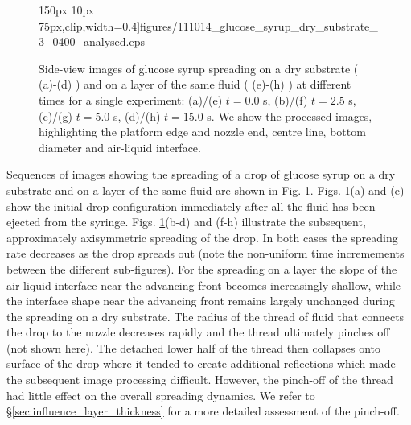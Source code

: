 \documentclass[aip,graphicx]{revtex4-1}
\begin{document}
\begin{figure}[!ht]
{{       150px 10px
       75px},clip,width=0.4\textwidth]{figures/111014_glucose_syrup_dry_substrate_3_0400_analysed.eps}}\addtocounter{subfigure}{+3} \hspace{0.5cm}
  \caption{Side-view images of glucose syrup spreading on a dry
    substrate ( (a)-(d) ) and on a layer of
    the same fluid ( (e)-(h) ) at different times for a single experiment: (a)/(e)
    $t=0.0$ s, (b)/(f) $t=2.5$ s, (c)/(g) $t=5.0$ s, (d)/(h) $t=15.0$
    s. We show the processed images,
    highlighting the platform edge and nozzle end, centre line, bottom
    diameter and air-liquid interface.\label{fig:glucose_spreading}}
\end{figure}

Sequences of images showing the spreading of a drop
of glucose syrup on a dry substrate and on a layer of the same fluid are shown in Fig.
\ref{fig:glucose_spreading}. Figs. \ref{fig:glucose_spreading}(a) and (e)
show the initial drop configuration immediately after all the fluid 
has been ejected from the syringe. Figs. 
\ref{fig:glucose_spreading}(b-d) and (f-h) illustrate the subsequent,
approximately axisymmetric spreading of the drop. In both cases the spreading
rate decreases as the drop spreads out (note the non-uniform time
incremements between the different sub-figures). For the spreading
on a layer
the slope of the air-liquid interface near the advancing front 
becomes increasingly shallow, while the interface shape near the
advancing front remains largely unchanged during the spreading on a dry substrate. The radius of the thread of fluid that connects
the drop to the nozzle decreases rapidly and the thread ultimately 
pinches off (not shown here). The detached lower half of the thread 
then collapses onto surface of the drop where it tended to create 
additional reflections which made the subsequent image processing 
difficult. However, the pinch-off of the thread had little effect on the 
overall spreading dynamics. We refer to \S \ref{sec:influence_layer_thickness} for a more detailed
assessment of the pinch-off.
\end{document}
